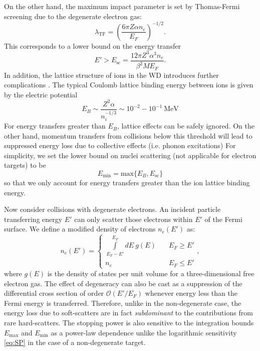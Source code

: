 \documentclass[twocolumn,showpacs,preprintnumbers,amsmath,amssymb,prd]{revtex4}
\def\r{\right)}
\def\l{\left(}
\begin{document}
\begin{appendices}
On the other hand, the maximum impact parameter is set by Thomas-Fermi screening due to the degenerate electron gas:
\begin{equation}
\label{eq:TF}
\lambda_{\text{TF}} = \l \frac{6 \pi Z \alpha n_e}{E_F}\r^{-1/2}.
\end{equation}
This corresponds to a lower bound on the energy transfer
\begin{equation}
E' > E_{\text{sc}} = \frac{12 \pi Z^3 \alpha ^3 n_e}{\beta^2 M E_F}.
\end{equation}
In addition, the lattice structure of ions in the WD introduces further complications \cite{Teukolsky}. The typical Coulomb lattice binding energy between ions is given by the electric potential
\begin{equation}
\label{eq:lattice}
E_B \sim \frac{Z^2 \alpha}{n_i^{-1/3}} \sim 10^{-2} - 10^{-1} ~\text{MeV}
\end{equation}
For energy transfers greater than $E_B$, lattice effects can be safely ignored. On the other hand, momentum transfers from collisions below this threshold will lead to suppressed energy loss due to collective effects (i.e. phonon excitations) For simplicity, we set the lower bound on nuclei scattering (not applicable for electron targets) to be
\begin{equation}
E_{\text{min}} = \text{max} \{E_B,E_{\text{sc}}\}
\end{equation}
so that we only account for energy transfers greater than the ion lattice binding energy.

Now consider collisions with degenerate electrons. An incident particle transferring energy $E'$ can only scatter those electrons within $E'$ of the Fermi surface. We define a modified density of electrons $n_e(E')$ as:
\begin{equation}
n_e(E') = \left\{
        \begin{array}{ll}
            \displaystyle \int \limits_{E_F -E'}^{E_F}dE ~g(E) & \quad E_F \geq E' \\
            n_e & \quad E_F \leq E'
        \end{array}
    \right.,
\end{equation}
where $g(E)$ is the density of states per unit volume for a three-dimensional free electron gas. The effect of degeneracy can also be cast as a suppression of the differential cross section of order $\mathcal{O}(E'/E_F)$ whenever energy less than the Fermi energy is transferred. Therefore, unlike in the non-degenerate case, the energy loss due to soft-scatters are in fact \emph{subdominant} to the contributions from rare hard-scatters. The stopping power is also sensitive to the integration bounds $E_{\text{max}}$ and $E_{\text{min}}$ as a power-law dependence unlike the logarithmic sensitivity \eqref{eq:SP} in the case of a non-degenerate target.


\end{appendices}
\end{document}
